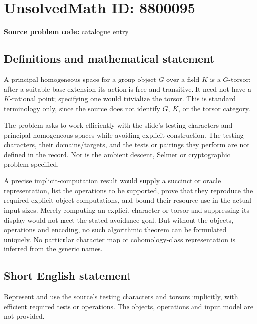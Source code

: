 \documentclass[11pt]{article}
\begin{document}
\section*{UnsolvedMath ID: 8800095}
\textbf{Source problem code:} catalogue entry
\subsection{Definitions and mathematical statement}
A principal homogeneous space for a group object $G$ over a field $K$ is a $G$-torsor: after a suitable base extension its action is free and transitive. It need not have a $K$-rational point; specifying one would trivialize the torsor. This is standard terminology only, since the source does not identify $G$, $K$, or the torsor category.

The problem asks to work efficiently with the slide's testing characters and principal homogeneous spaces while avoiding explicit construction. The testing characters, their domains/targets, and the tests or pairings they perform are not defined in the record. Nor is the ambient descent, Selmer or cryptographic problem specified.

A precise implicit-computation result would supply a succinct or oracle representation, list the operations to be supported, prove that they reproduce the required explicit-object computations, and bound their resource use in the actual input sizes. Merely computing an explicit character or torsor and suppressing its display would not meet the stated avoidance goal. But without the objects, operations and encoding, no such algorithmic theorem can be formulated uniquely. No particular character map or cohomology-class representation is inferred from the generic names.
\subsection{Short English statement}
Represent and use the source's testing characters and torsors implicitly, with efficient required tests or operations. The objects, operations and input model are not provided.
\end{document}

